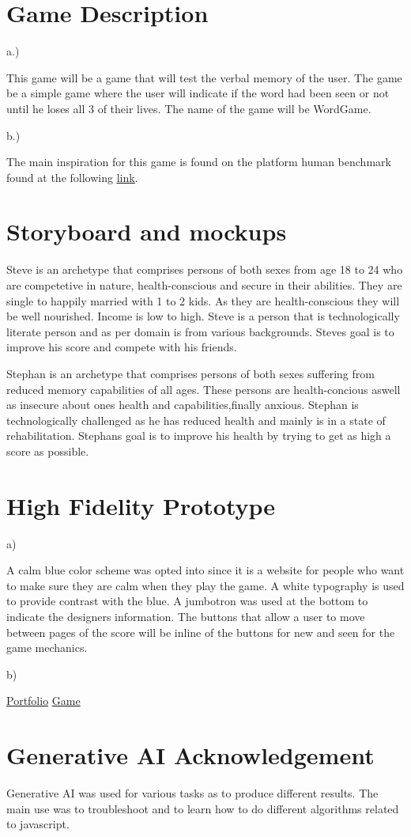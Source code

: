 \section{Game Description}
a.)\hspace{10pt}\parbox{12cm}{This game will be a game that will test the verbal memory of the user. The game be a simple game where the user will indicate if the word had been seen or not until he loses all 3 of their lives. The name of the game will be WordGame.}\newline\newline

b.)\hspace{10pt}\parbox{12cm}{The main inspiration for this game is found on the platform human benchmark found at the following \underline{\href{https://humanbenchmark.com/tests/verbal-memory}{link}}.}
\section{Storyboard and mockups}
\begin{list}{ }{ }
    \item Steve is an archetype that comprises persons of both sexes from age 18 to 24 who are competetive in nature, health-conscious and secure in their abilities. They are single to happily married with 1 to 2 kids. As they are health-conscious they will be well nourished. Income is low to high. Steve is a person that is technologically literate person and as per domain is from various backgrounds. Steves goal is to improve his score and compete with his friends.
    \item Stephan is an archetype that comprises persons of both sexes suffering from reduced memory capabilities of all ages. These persons are health-concious aswell as insecure about ones health and capabilities,finally anxious. Stephan is technologically challenged as he has reduced health and mainly is in a state of rehabilitation. Stephans goal is to improve his health by trying to get as high a score as possible.
\end{list}
\section{High Fidelity Prototype}
a)\parbox{12cm}{A calm blue color scheme was opted into since it is a website for people who want to make sure they are calm when they play the game. A white typography is used to provide contrast with the blue. A jumbotron was used at the bottom to indicate the designers information. The buttons that allow a user to move between pages of the score will be inline of the buttons for new and seen for the game mechanics. }
b)\parbox{12cm}{\href{https://hah12gamer.github.io/husseinabouhamad/}{Portfolio}   \href{https://hah12gamer.github.io/husseinabouhamad/WordGame/WordGame.html}{Game}}
\section{Generative AI Acknowledgement}
\parbox{12cm}{Generative AI was used for various tasks as to produce different results. The main use was to troubleshoot and to learn how to do different algorithms related to javascript.}

